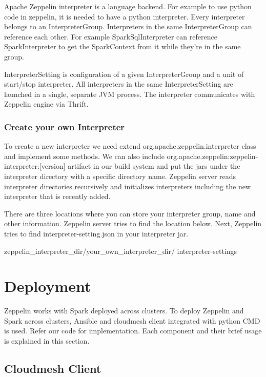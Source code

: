 \documentclass[9pt,twocolumn,twoside]{../../styles/osajnl}
\begin{document}
	Apache Zeppelin interpreter is a language backend. For example to 
	use 
	python code in zeppelin, it is needed to have a python 
	interpreter. 
	Every interpreter belongs to an InterpreterGroup. Interpreters in 
	the 
	same InterpreterGroup can reference each other. For example 
	SparkSqlInterpreter can reference SparkInterpreter to get the 
	SparkContext from it while they're in the same group.
	
	InterpreterSetting is configuration of a given InterpreterGroup 
	and a 
	unit of start/stop interpreter. All interpreters in the same 
	InterpreterSetting are launched in a single, separate JVM 
	process. 
	The interpreter communicates with Zeppelin engine via Thrift.
	
	\subsubsection{Create your own Interpreter}
	
	To create a new interpreter we need extend 
	org.apache.zeppelin.interpreter class and implement some methods. 
	We 
	can also include 
	org.apache.zeppelin:zeppelin-interpreter:[version] 
	artifact in our build system and put the jars under the 
	interpreter 
	directory with a specific directory name. Zeppelin server reads 
	interpreter directories recursively and initializes interpreters 
	including the new interpreter that is recently added.
	
	There are three locations where you can store your interpreter 
	group, 
	name and other information. Zeppelin server tries to find the 
	location below. Next, Zeppelin tries to find 
	interpreter-setting.json 
	in your interpreter jar.
	
	zeppelin\_interpreter\_dir/your\_own\_interpreter\_dir/
	interpreter-settings
	
	\section{Deployment}
	
	Zeppelin works with Spark deployed across clusters. To deploy 
	Zeppelin
	and Spark across clusters, Ansible and cloudmesh client integrated
	with python CMD is used. Refer our code for implementation. Each
	component and their brief usage is explained in this section.
	
	\subsection{Cloudmesh Client}
	
\end{document}
